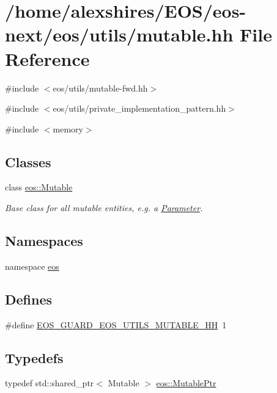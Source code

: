 \hypertarget{mutable_8hh}{
\section{/home/alexshires/EOS/eos-\/next/eos/utils/mutable.hh File Reference}
\label{mutable_8hh}
}
{\ttfamily \#include $<$eos/utils/mutable-\/fwd.hh$>$}\par
{\ttfamily \#include $<$eos/utils/private\_\-implementation\_\-pattern.hh$>$}\par
{\ttfamily \#include $<$memory$>$}\par
\subsection*{Classes}
\begin{DoxyCompactItemize}
\item 
class \hyperlink{classeos_1_1Mutable}{eos::Mutable}
\begin{DoxyCompactList}\small\item\em Base class for all mutable entities, e.g. a \hyperlink{classeos_1_1Parameter}{Parameter}. \item\end{DoxyCompactList}\end{DoxyCompactItemize}
\subsection*{Namespaces}
\begin{DoxyCompactItemize}
\item 
namespace \hyperlink{namespaceeos}{eos}
\end{DoxyCompactItemize}
\subsection*{Defines}
\begin{DoxyCompactItemize}
\item 
\#define \hyperlink{mutable_8hh_af601921bc46cf0f74dabe66ca841b6e8}{EOS\_\-GUARD\_\-EOS\_\-UTILS\_\-MUTABLE\_\-HH}~1
\end{DoxyCompactItemize}
\subsection*{Typedefs}
\begin{DoxyCompactItemize}
\item 
typedef std::shared\_\-ptr$<$ Mutable $>$ \hyperlink{namespaceeos_a0ab446e6a801d96a1ee83bb7c070686f}{eos::MutablePtr}
\end{DoxyCompactItemize}


